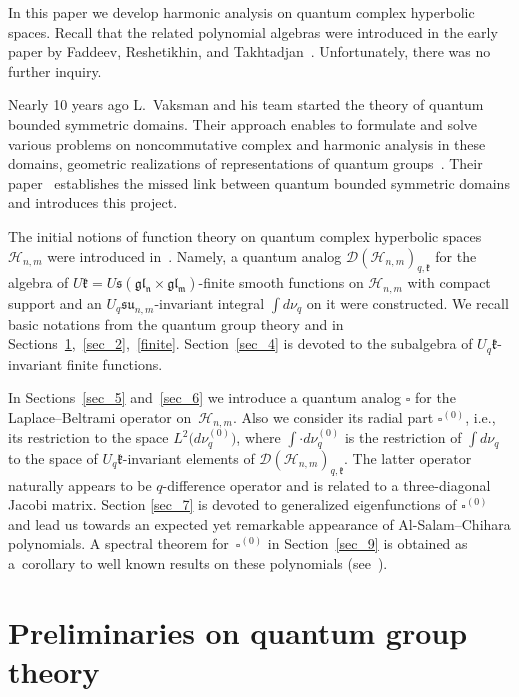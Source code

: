 \documentclass[pdftex]{sigma}
\begin{document}
In this paper we develop harmonic analysis on quantum complex hyperbolic spaces. Recall that the related polynomial
algebras were introduced in the early paper by Faddeev, Reshetikhin, and Takhtadjan~\cite{RTF}. Unfortunately,
there was no further inquiry.

Nearly 10 years ago L.~Vaksman and his team started the theory of quantum bounded symmetric domains. Their
approach enables to formulate and solve various problems on noncommutative complex and harmonic analysis in
these domains, geometric realizations of representations of quantum groups~\cite{V}. Their paper~\cite{Penrose} establishes the missed link between quantum bounded symmetric domains and introduces this
project.

The initial notions of function theory on quantum complex hyperbolic spaces $\mathscr{H}_{n,m}$ were
introduced in~\cite{BS}. Namely, a quantum analog $\mathscr{D}(\mathscr{H}_{n,m})_{q,\mathfrak{k}}$ for the
algebra of $U \mathfrak{k} = U \mathfrak{s(gl_n \times gl_m)}$-f\/inite smooth functions on $\mathscr{H}_{n,m}$ with compact support
and an $U_q \mathfrak{su}_{n,m}$-invariant integral $\int d\nu_q$ on it were constructed. We recall basic
notations from the quantum group theory and \cite{BS} in Sections~\ref{sec_1},~\ref{sec_2},~\ref{finite}.
Section~\ref{sec_4} is devoted to the subalgebra of $U_q \mathfrak{k}$-invariant f\/inite functions.

In Sections~\ref{sec_5} and~\ref{sec_6} we introduce a quantum analog $\square$ for the Laplace--Beltrami operator on~$\mathscr{H}_{n,m}$. Also we consider its radial part $\square^{(0)}$, i.e., its restriction to the space
$L^2\big(d\nu_q^{(0)}\big)$, where $\int \cdot d\nu_q^{(0)}$ is the restriction of $\int d\nu_q$ to the space of $U_q
\mathfrak{k}$-invariant elements of $\mathscr{D}(\mathscr{H}_{n,m})_{q,\mathfrak{k}}$. The latter operator
naturally appears to be $q$-dif\/ference operator and is related to a three-diagonal Jacobi matrix. Section
\ref{sec_7} is devoted to generalized eigenfunctions of $\square^{(0)}$ and lead us towards an expected yet
remarkable appearance of Al-Salam--Chihara polynomials. A spectral theorem for~$\square^{(0)}$ in Section~\ref{sec_9} is obtained as a~corollary to well known results on these polynomials (see~\cite{koekoek}).


\section{Preliminaries on quantum group theory}\label{sec_1}
\end{document}
